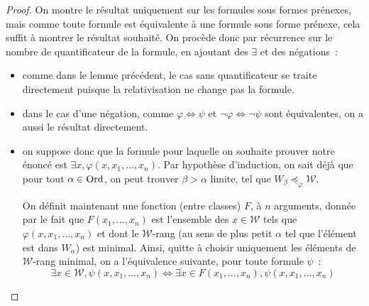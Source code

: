 \begin{proof}
  On montre le résultat uniquement sur les formules sous formes prénexes, mais
  comme toute formule est équivalente à une formule sous forme prénexe, cela
  suffit à montrer le résultat souhaité. On procède donc par récurrence sur
  le nombre de quantificateur de la formule, en ajoutant des $\exists$ et des
  négations~:
  \begin{itemize}
  \item comme dans le lemme précédent, le cas sans quantificateur se traite
    directement puisque la relativisation ne change pas la formule.
  \item dans le cas d'une négation, comme $\varphi \iff \psi$ et
    $\lnot\varphi\iff\lnot\psi$ sont équivalentes, on a aussi le résultat
    directement.
  \item on suppose donc que la formule pour laquelle on souhaite prouver notre
    énoncé est $\exists x, \varphi(x,x_1,\ldots,x_n)$. Par hypothèse
    d'induction, on sait déjà que pour tout $\alpha \in \operatorname{Ord}$, on peut trouver
    $\beta > \alpha$ limite, tel que
    $W_\beta \preccurlyeq_{\varphi} \mathcal W$.

    On définit maintenant une fonction (entre classes) $F$, à $n$ arguments,
    donnée par le fait que $F(x_1,\ldots,x_n)$ est l'ensemble des
    $x \in \mathcal W$ tels que $\varphi(x,x_1,\ldots,x_n)$ et dont le
    $\mathcal W$-rang (au sens de plus petit $\alpha$ tel que l'élément est dans
    $W_\alpha$) est minimal. Ainsi, quitte à choisir uniquement les éléments de
    $\mathcal W$-rang minimal, on a l'équivalence suivante, pour toute formule
    $\psi$~:
    \[\exists x \in \mathcal W, \psi(x,x_1,\ldots,x_n) \iff
    \exists x \in F(x_1,\ldots,x_n), \psi(x,x_1,\ldots,x_n)\]


\end{itemize}
\end{proof}
